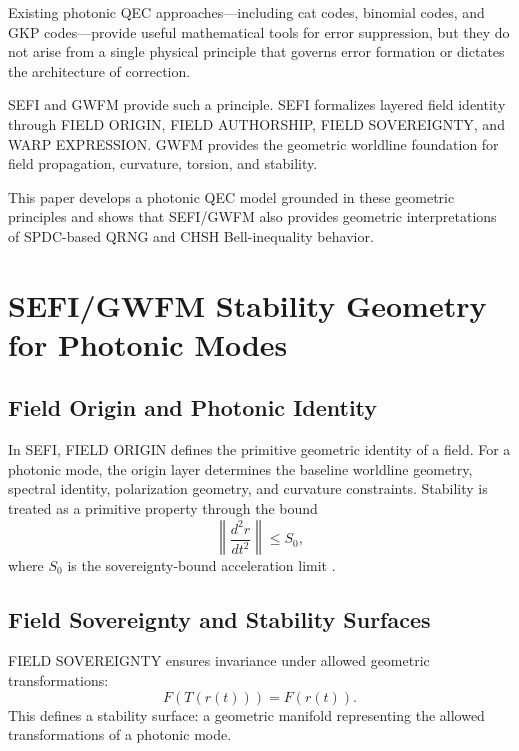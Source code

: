 \documentclass[aip, adv, reprint, superscriptaddress]{revtex4-2}
\begin{document}
Existing photonic QEC approaches---including cat codes, binomial codes, and GKP 
codes---provide useful mathematical tools for error suppression, but they do not arise 
from a single physical principle that governs error formation or dictates the architecture 
of correction.

SEFI \cite{DuttonSEFI} and GWFM \cite{DuttonGWFM} provide such a principle. SEFI 
formalizes layered field identity through FIELD ORIGIN, FIELD AUTHORSHIP, FIELD 
SOVEREIGNTY, and WARP EXPRESSION. GWFM provides the geometric worldline 
foundation for field propagation, curvature, torsion, and stability.

This paper develops a photonic QEC model grounded in these geometric principles and 
shows that SEFI/GWFM also provides geometric interpretations of SPDC-based QRNG 
and CHSH Bell-inequality behavior.

\section{SEFI/GWFM Stability Geometry for Photonic Modes}

\subsection{Field Origin and Photonic Identity}

In SEFI, FIELD ORIGIN defines the primitive geometric identity of a field. For a photonic 
mode, the origin layer determines the baseline worldline geometry, spectral identity, 
polarization geometry, and curvature constraints. Stability is treated as a primitive 
property through the bound
\begin{equation}
\left\| \frac{d^2 r}{dt^2} \right\| \le S_0,
\end{equation}
where $S_0$ is the sovereignty-bound acceleration limit \cite{DuttonSEFI}.

\subsection{Field Sovereignty and Stability Surfaces}

FIELD SOVEREIGNTY ensures invariance under allowed geometric transformations:
\begin{equation}
F(T(r(t))) = F(r(t)).
\end{equation}
This defines a stability surface: a geometric manifold representing the allowed 
transformations of a photonic mode.
\end{document}
